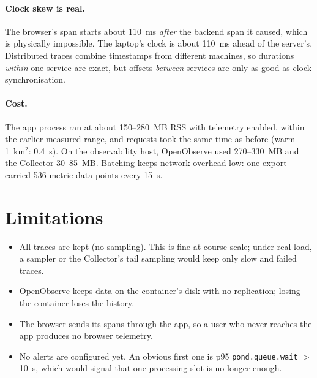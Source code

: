 \documentclass[manuscript,screen]{acmart}
\begin{document}
\paragraph{Clock skew is real.} The browser's span starts about 110~ms
\emph{after} the backend span it caused, which is physically impossible.
The laptop's clock is about 110~ms ahead of the server's. Distributed
traces combine timestamps from different machines, so durations
\emph{within} one service are exact, but offsets \emph{between} services are
only as good as clock synchronisation.

\paragraph{Cost.} The app process ran at about 150--280~MB RSS with
telemetry enabled, within the earlier measured range, and requests took
the same time as before (warm 1~km$^2$: 0.4~s). On the observability host,
OpenObserve used 270--330~MB and the Collector 30--85~MB. Batching keeps
network overhead low: one export carried 536 metric data points every
15~s.

\section{Limitations}
\begin{itemize}
\item All traces are kept (no sampling). This is fine at course scale; under
  real load, a sampler or the Collector's tail sampling would keep only
  slow and failed traces.
\item OpenObserve keeps data on the container's disk with no replication;
  losing the container loses the history.
\item The browser sends its spans through the app, so a user who never
  reaches the app produces no browser telemetry.
\item No alerts are configured yet. An obvious first one is p95
  \texttt{pond.queue.wait} $>$ 10~s, which would signal that one processing
  slot is no longer enough.
\end{itemize}

\end{document}
